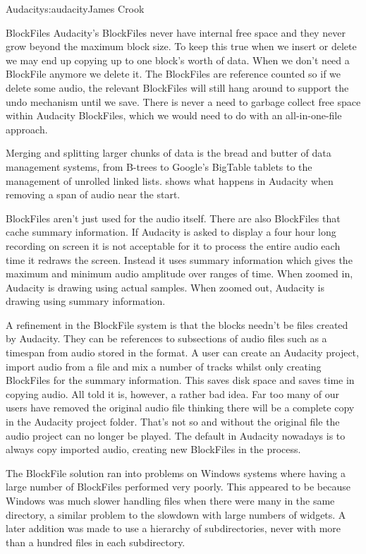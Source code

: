 \begin{aosachapter}{Audacity}{s:audacity}{James Crook}
\begin{aosasect1}{BlockFiles}
Audacity's BlockFiles never have internal free space and they never
grow beyond the maximum block size.  To keep this true when we insert
or delete we may end up copying up to one block's worth of data.  When
we don't need a BlockFile anymore we delete it.  The BlockFiles are
reference counted so if we delete some audio, the relevant BlockFiles
will still hang around to support the undo mechanism until we save.
There is never a need to garbage collect free space within
Audacity BlockFiles, which we would need to do with an all-in-one-file
approach.

Merging and splitting larger chunks of data is the bread and butter of
data management systems, from B-trees to Google's BigTable tablets to
the management of unrolled linked lists.   shows
what happens in Audacity when removing a span of audio near the start.


BlockFiles aren't just used for the audio itself.  There are also
BlockFiles that cache summary information.  If Audacity is asked to
display a four hour long recording on screen it is not acceptable for
it to process the entire audio each time it redraws the screen.
Instead it uses summary information which gives the maximum and
minimum audio amplitude over ranges of time.  When zoomed in,
Audacity is drawing using actual samples.  When zoomed out,
Audacity is drawing using summary information.

A refinement in the BlockFile system is that the blocks needn't be
files created by Audacity.  They can be references to subsections of
audio files such as a timespan from audio stored in the  format.
A user can create an Audacity project, import audio from a  file
and mix a number of tracks whilst only creating BlockFiles for the
summary information.  This saves disk space and saves time in copying
audio.  All told it is, however, a rather bad idea.  Far too many of
our users have removed the original audio  file thinking there
will be a complete copy in the Audacity project folder.  That's not so
and without the original  file the audio project can no longer be
played.  The default in Audacity nowadays is to always copy imported
audio, creating new BlockFiles in the process.

The BlockFile solution ran into problems on Windows systems where
having a large number of BlockFiles performed very poorly.  This appeared
to be because Windows was much slower handling
files when there were many in the same directory, a similar problem to
the slowdown with large numbers of widgets.  A later addition was made
to use a hierarchy of subdirectories, never with more than a hundred
files in each subdirectory.


\end{aosasect1}
\end{aosachapter}
